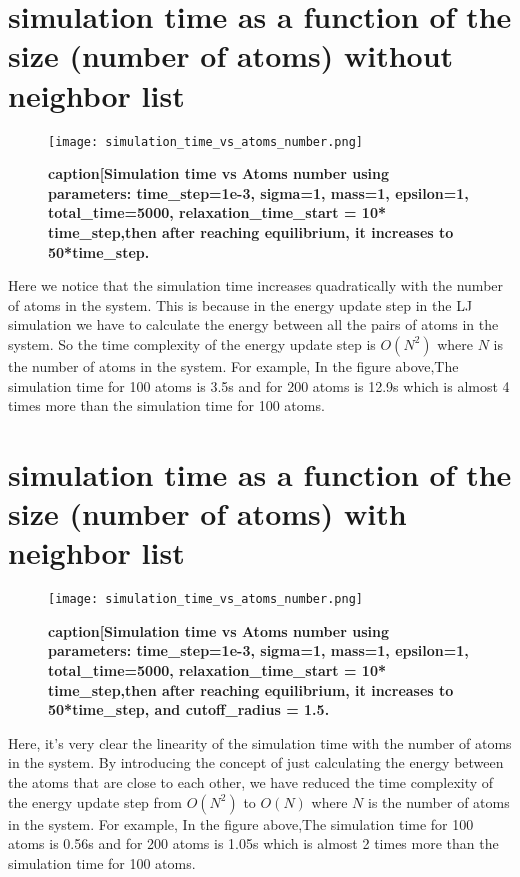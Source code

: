 \section{simulation time as a function of the size (number of atoms) without neighbor list}
\graphicspath{ {./figures/milestone05/} }
\begin{figure}[!htb]
\centering
    \texttt{[image: simulation\_time\_vs\_atoms\_number.png]}
    \caption[Simulation time vs Atoms number]{\textbf{caption[Simulation time vs Atoms number using parameters: time\_step=1e-3, sigma=1, mass=1, epsilon=1, total\_time=5000, relaxation\_time\_start = 10* time\_step,then after reaching equilibrium, it increases to 50*time\_step.}}
\label{fig:simulation_time_vs_atoms_number}
\end{figure}
Here we notice that the simulation time increases quadratically with the number of atoms in the system. This is because in the energy update step in the LJ simulation we have to calculate the energy between all the pairs of atoms in the system. So the time complexity of the energy update step is $O(N^2)$ where $N$ is the number of atoms in the system. For example, In the figure above,The  simulation time for 100 atoms is 3.5s and for 200 atoms is 12.9s which is almost 4 times more than the simulation time for 100 atoms.

\section{simulation time as a function of the size (number of atoms) with neighbor list}
\graphicspath{ {./figures/milestone06/} }
\begin{figure}[!htb]
\centering
    \texttt{[image: simulation\_time\_vs\_atoms\_number.png]}
    \caption[Simulation time vs Atoms number]{\textbf{caption[Simulation time vs Atoms number using parameters: time\_step=1e-3, sigma=1, mass=1, epsilon=1, total\_time=5000, relaxation\_time\_start = 10* time\_step,then after reaching equilibrium, it increases to 50*time\_step, and cutoff\_radius = 1.5.}}
\label{fig:simulation_time_vs_atoms_number}
\end{figure}
Here, it's very clear the linearity of the simulation time with the number of atoms in the system. By introducing the concept of just calculating the energy between the atoms that are close to each other, we have reduced the time complexity of the energy update step from $O(N^2)$ to $O(N)$ where $N$ is the number of atoms in the system. For example, In the figure above,The  simulation time for 100 atoms is 0.56s and for 200 atoms is 1.05s which is almost 2 times more than the simulation time for 100 atoms.

